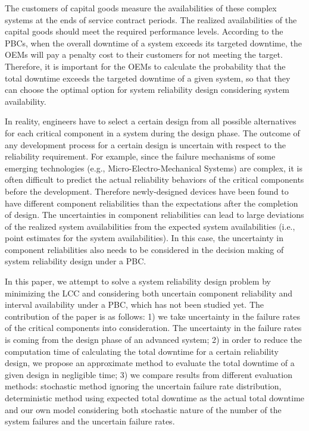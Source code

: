 \documentclass[preprint,12pt]{elsarticle}
\begin{document}

The customers of capital goods measure the availabilities of these complex systems at the ends of service contract periods. The realized availabilities of the capital goods should meet the required performance levels. According to the PBCs, when the overall downtime of a system exceeds its targeted downtime, the OEMs will pay a penalty cost to their customers for not meeting the target. Therefore, it is important for the OEMs to calculate the probability that the total downtime exceeds the targeted downtime of a given system, so that they can choose the optimal option for system reliability design considering system availability.


In reality, engineers have to select a certain design from all possible alternatives for each critical component in a system during the design phase. The outcome of any development process for a certain design is uncertain with respect to the reliability requirement. For example, since the failure mechanisms of some emerging technologies (e.g., Micro-Electro-Mechanical Systems) are complex, it is often difficult to predict the actual reliability behaviors of the critical components before the development. Therefore newly-designed devices have been found to have different component reliabilities than the expectations after the completion of design. The uncertainties in component reliabilities can lead to large deviations of the realized system availabilities from the expected system availabilities (i.e., point estimates for the system availabilities). In this case, the uncertainty in component reliabilities also needs to be considered in the decision making of system reliability design under a PBC.

In this paper, we attempt to solve a system reliability design problem by minimizing the LCC and considering both uncertain component reliability and interval availability under a PBC, which has not been studied yet. The contribution of the paper is as follows: 1) we take uncertainty in the failure rates of the critical components into consideration. The uncertainty in the failure rates is coming from the design phase of an advanced system; 2) in order to reduce the computation time of calculating the total downtime for a certain reliability design, we propose an approximate method to evaluate the total downtime of a given design in negligible time; 3) we compare results from different evaluation methods: stochastic method ignoring the uncertain failure rate distribution, deterministic method using expected total downtime as the actual total downtime and our own model considering both stochastic nature of the number of the system failures and the uncertain failure rates.
\end{document}
